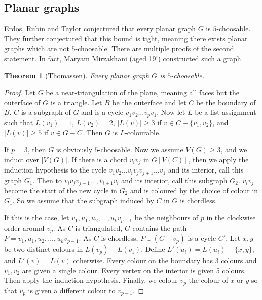 \documentclass[]{article}
\newtheorem{theorem}{Theorem}
\theoremstyle{definition}
\numberwithin{theorem}{section}
\numberwithin{equation}{section}
\begin{document}
\subsection{Planar graphs}
Erdos, Rubin and Taylor conjectured that every planar graph $G$ is $5$-choosable. They further conjectured that this bound is tight, meaning there exists planar graphs which are not $5$-choosable. There are multiple proofs of the second statement. In fact, Maryam Mirzakhani (aged 19!) constructed such a graph.  

\begin{theorem}[Thomassen]
	Every planar graph $G$ is $5$-choosable.
\end{theorem}

\begin{proof}
	Let $G$ be a near-triangulation of the plane, meaning all faces but the outerface of $G$ is a triangle. Let $B$ be the outerface and let $C$ be the boundary of $B$. $C$ is a subgraph of $G$ and is a cycle $v_1 v_2 \ldots v_p v_1$. Now let $L$ be a list assignment such that $L(v_1) = 1$, $L(v_2) = 2$, $|L(v)| \geq 3$ if $v \in C - \{v_1, v_2\}$, and $|L(v)| \geq 5$ if $v \in G - C$. Then $G$ is $L$-colourable. 

	If $p = 3$, then $G$ is obviously $5$-choosable. Now we assume $V(G) \geq 3$, and we induct over $|V(G)|$. If there is a chord $v_i v_j$ in $G[V(C)]$, then we apply the induction hypothesis to the cycle $v_1 v_2 \ldots v_i v_j v_{j + 1} \ldots v_1$ and its interior, call this graph $G_1$. Then to $v_i v_j v_{j - 1} \ldots, v_{i + 1} v_i$ and its interior, call this subgraph $G_2$. $v_i v_j$ become the start of the new cycle in $G_2$ and is coloured by the choice of colour in $G_1$. So we assume that the subgraph induced by $C$ in $G$ is chordless. 

	If this is the case, let $v_1, u_1, u_2, \ldots, u_k v_{p-1}$ be the neighbours of $p$ in the clockwise order around $v_p$. As $C$ is triangulated, $G$ contains the path $P = v_1, u_1, u_2, \ldots, u_k v_{p-1}$. As $C$ is chordless, $P \cup (C - v_p)$ is a cycle $C'$. Let $x, y$ be two distinct colours in $L(v_p) - L(v_1)$. Define $L'(u_i) = L(u_i) - \{x, y\}$, and $L'(v) = L(v)$ otherwise. Every colour on the boundary has 3 colours and $v_1, v_2$ are given a single colour. Every vertex on the interior is given 5 colours. Then apply the induction hypothesis. Finally, we colour $v_p$ the colour of $x$ or $y$ so that $v_p$ is given a different colour to $v_{p-1}$.
\end{proof}
\end{document}
